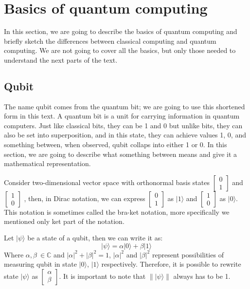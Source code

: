 \chapter{Basics of quantum computing}

In this section, we are going to describe the basics of quantum computing and briefly sketch the differences between classical computing and quantum computing. We are not going to cover all the basics, but only those needed to understand the next parts of the text.

\section{Qubit}

The name qubit comes from the quantum bit; we are going to use this shortened form in this text. A quantum bit is a unit for carrying information in quantum computers. Just like classical bits, they can be 1 and 0 but unlike bits, they can also be set into superposition, and in this state, they can achieve values 1, 0, and something between, when observed, qubit collaps into either 1 or 0. In this section, we are going to describe what something between means and give it a mathematical representation.


Consider two-dimensional vector space with orthonormal basis states 
$\begin{bmatrix}
     0\\
     1
\end{bmatrix}$
and
$\begin{bmatrix}
     1\\
     0
\end{bmatrix}$
, then, in Dirac notation, we can express 
$\begin{bmatrix}
     0\\
     1
\end{bmatrix}$
as
$|1\rangle$
and
$\begin{bmatrix}
     1\\
     0
\end{bmatrix}$
as
$|0\rangle$. This notation is sometimes called the bra-ket notation, more specifically we mentioned only ket part of the notation. 

Let $| \psi \rangle$ be a  state of a qubit, then we can write it as:
\begin{equation}
    |\psi\rangle = \alpha |0\rangle +\beta |1\rangle
\end{equation}
Where $\alpha, \beta \ \in \mathbb{C}$ and  $|\alpha|^2 + |\beta|^2 = 1$, $|\alpha| ^2$ and $|\beta| ^2$ represent possibilities of measuring qubit in state $| 0 \rangle$, $|1\rangle$ respectively. Therefore, it is possible to rewrite state $| \psi \rangle$ as 
$\begin{bmatrix}
    \alpha \\
    \beta
\end{bmatrix}$. It is important to note that $\lVert | \psi \rangle \rVert$ always has to be 1. 

